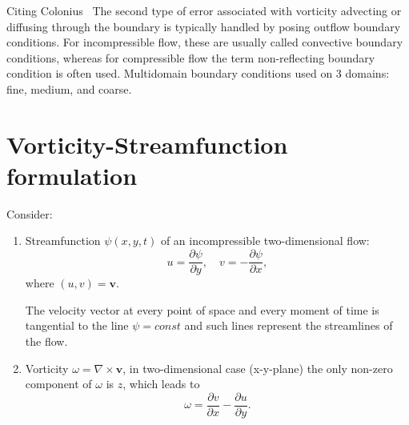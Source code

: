 \documentclass{article}
\begin{document}
Citing Colonius~\cite{Colonius:2008} The second type of error associated with vorticity advecting or diffusing through the boundary is typically handled by posing outflow boundary conditions. For incompressible flow, these are usually called convective boundary conditions, whereas for compressible flow the term non-reflecting boundary condition is often used. Multidomain boundary conditions used on 3 domains: fine, medium, and coarse. 
	
	
	\section{Vorticity-Streamfunction formulation}\label{sec:vorticity-streamfunction}
	
	Consider:
	
	\begin{enumerate}
	\item	

	Streamfunction $\psi(x,y,t)$ of an incompressible two-dimensional flow:
	\begin{equation}
	\label{eqn:streamfunction}
		u = \frac{\partial \psi}{\partial y},\quad v=-\frac{\partial \psi}{\partial x},
	\end{equation}
	where $(u,v)=\boldsymbol{v}$.
	
	The velocity vector at every point of space and every moment of time is tangential to the line $\psi = const$ and such lines represent the streamlines of the flow. 
	\item
	
	Vorticity $\omega = \nabla \times \boldsymbol{v}$, in two-dimensional case (x-y-plane) the only non-zero component of $\omega$ is $z$, which leads to
	\begin{equation}
	\label{eqn:vorticity}
		\omega=\frac{\partial v}{\partial x} - \frac{\partial u}{\partial y}.
	\end{equation}
	\end{enumerate}
	
\end{document}
